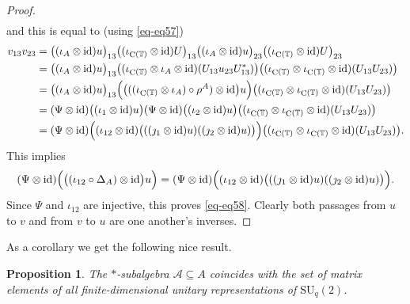 \documentclass[12pt,reqno,a4paper]{amsart}
\newtheorem{proposition}{Proposition}[section]
\theoremstyle{definition}
\newcommand{\comp}{\circ}
\newcommand{\id}{\mathrm{id}}
\newcommand{\tens}{\otimes}
\newcommand{\TT}{\mathbb{T}}
\newcommand{\cA}{\mathscr{A}}
\DeclareMathOperator{\C}{C}
\newcommand{\SU}{\mathrm{SU}}
\numberwithin{equation}{section}
\begin{document}
\begin{proof}
\begin{align*}
\end{align*}
and this is equal to (using \eqref{eq-eq57})
\begin{align*}
v_{13}v_{23}
&=\bigl((\iota_A\tens\id)u\bigr)_{13}
\bigl((\iota_{\C(\TT)}\tens\id)U\bigr)_{13}
\bigl((\iota_A\tens\id)u\bigr)_{23}
\bigl((\iota_{\C(\TT)}\tens\id)U\bigr)_{23}\\
&=
\bigl((\iota_A\tens\id)u\bigr)_{13}
\bigl((\iota_{\C(\TT)}\tens\iota_A\tens\id)(U_{13}u_{23}U_{13}^*)\bigr)
\bigl((\iota_{\C(\TT)}\tens\iota_{\C(\TT)}\tens\id)(U_{13}U_{23})\bigr)\\
&=\bigl((\iota_A\tens\id)u\bigr)_{13}
\Bigl(\bigl(((\iota_{\C(\TT)}\tens\iota_A)\comp\rho^A)\tens\id\bigr)u\Bigr)
\bigl((\iota_{\C(\TT)}\tens\iota_{\C(\TT)}\tens\id)(U_{13}U_{23})\bigr)\\
&=(\Psi\tens\id)
\bigl((\iota_1\tens\id)u\bigr)
(\Psi\tens\id)
\bigl((\iota_2\tens\id)u\bigr)
\bigl((\iota_{\C(\TT)}\tens\iota_{\C(\TT)}\tens\id)(U_{13}U_{23})\bigr)\\
&=(\Psi\tens\id)\Bigl(
(\iota_{12}\tens\id)\bigl(((\jmath_1\tens\id)u)((\jmath_2\tens\id)u)\bigr)
\Bigr)
\bigl((\iota_{\C(\TT)}\tens\iota_{\C(\TT)}\tens\id)(U_{13}U_{23})\bigr).
\end{align*}
This implies
\[
(\Psi\tens\id)\Bigl(\bigl((\iota_{12}\comp\Delta_A)\tens\id\bigr)u\Bigr)=
(\Psi\tens\id)
\Bigl(
(\iota_{12}\tens\id)\bigl(((\jmath_1\tens\id)u)((\jmath_2\tens\id)u)\bigr)
\Bigr).
\]
Since $\Psi$ and $\iota_{12}$ are injective, this proves \eqref{eq-eq58}. Clearly both passages from $u$ to $v$ and from $v$ to $u$ are one another's inverses.
\end{proof}

As a corollary we get the following nice result.

\begin{proposition}\label{prop-prop7}
The $*$-subalgebra $\cA\subseteq A$ coincides with the set of matrix elements of all finite-dimensional unitary representations of $\SU_q(2)$.
\end{proposition}
\end{document}
